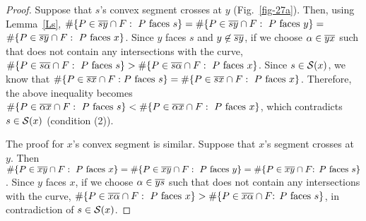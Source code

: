 \begin{proof}
Suppose that $s$'s convex segment crosses  at $y$ (Fig.~\ref{fig-27a}).
Then, using Lemma~\ref{Ls}, $\#\{P \in \mbox{$\overline{sy}$} \cap F: \mbox{ $P$ faces $s$}\} = 
\#\{P \in \mbox{$\overline{sy}$} \cap F: \mbox{ $P$ faces $y$}\} =$
\mbox{$\#\{P \in \mbox{$\overline{sy}$} \cap F: \mbox{ $P$ faces $x$}\}$}.
Since $y$ faces $s$ and $y \not\in \mbox{$\overline{sy}$}$, 
if we choose $\alpha \in \mbox{$\overline{yx}$}$ such that  
does not contain any intersections with the curve, 
$\#\{P \in \mbox{$\overline{s\alpha}$} \cap F: \mbox{ $P$ faces $s$}\} >
\#\{P \in \mbox{$\overline{s\alpha}$} \cap F: \mbox{ $P$ faces $x$}\}$.
Since $s \in {\cal S}(x)$, we know that 
$\#\{P \in \mbox{$\overline{sx}$} \cap F: \mbox{$P$ faces $s$}\} =
\#\{P \in \mbox{$\overline{sx}$} \cap F: \mbox{ $P$ faces $x$}\}$.
Therefore, the above inequality 
becomes $\#\{P \in \mbox{$\overline{\alpha x}$} \cap F: \mbox{ $P$ faces $s$}\} <
\#\{P \in \mbox{$\overline{\alpha x}$} \cap F: \mbox{ $P$ faces $x$}\}$, 
which contradicts $s \in {\cal S}(x)$ (condition (2)).


The proof for $x$'s convex segment is similar.
Suppose that $x$'s segment crosses  at $y$.
Then $\#\{P \in \mbox{$\overline{xy}$} \cap F: \mbox{ $P$ faces $x$}\} = 
\#\{P \in \mbox{$\overline{xy}$} \cap F: \mbox{ $P$ faces $y$}\} = 
\mbox{$\#\{P \in \mbox{$\overline{xy}$} \cap F$: $P$ faces $s$\}}$.
Since $y$ faces $x$, if we choose $\alpha \in \mbox{$\overline{ys}$}$ such that  
does not contain any intersections with the curve, 
$\#\{P \in \mbox{$\overline{x\alpha}$} \cap F: \mbox{ $P$ faces $x$}\} 
> \mbox{$\#\{P \in \mbox{$\overline{x\alpha}$} \cap F$: $P$ faces $s$\}}$,
in contradiction of $s \in {\cal S}(x)$.
\end{proof}

